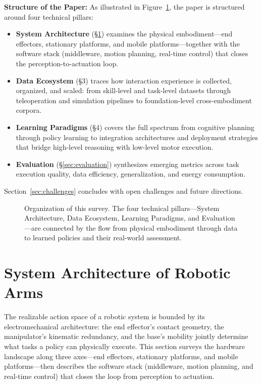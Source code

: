\documentclass[acmsmall,screen,review,anonymous]{acmart}
\begin{document}
\textbf{Structure of the Paper:}
As illustrated in Figure~\ref{fig:survey_structure}, the paper is structured around four technical pillars:

\begin{itemize}[nosep,leftmargin=*]
  \item \textbf{System Architecture} (\S\ref{sec:embodiment_hardware}) examines the physical embodiment---end effectors, stationary platforms, and mobile platforms---together with the software stack (middleware, motion planning, real-time control) that closes the perception-to-actuation loop.
  \item \textbf{Data Ecosystem} (\S3) traces how interaction experience is collected, organized, and scaled: from skill-level and task-level datasets through teleoperation and simulation pipelines to foundation-level cross-embodiment corpora.
  \item \textbf{Learning Paradigms} (\S4) covers the full spectrum from cognitive planning through policy learning to integration architectures and deployment strategies that bridge high-level reasoning with low-level motor execution.
  \item \textbf{Evaluation} (\S\ref{sec:evaluation}) synthesizes emerging metrics across task execution quality, data efficiency, generalization, and energy consumption.
\end{itemize}

Section~\ref{sec:challenges} concludes with open challenges and future directions.

\begin{figure}[t]
  \centering
  \framebox[\textwidth]{\rule{0pt}{6cm}} %
  \caption{Organization of this survey. The four technical pillars---System Architecture, Data Ecosystem, Learning Paradigms, and Evaluation---are connected by the flow from physical embodiment through data to learned policies and their real-world assessment.}\label{fig:survey_structure}
\end{figure}

\section{System Architecture of Robotic Arms}\label{sec:embodiment_hardware}

The realizable action space of a robotic system is bounded by its electromechanical architecture: the end effector's contact geometry, the manipulator's kinematic redundancy, and the base's mobility jointly determine what tasks a policy can physically execute. This section surveys the hardware landscape along three axes---end effectors, stationary platforms, and mobile platforms---then describes the software stack (middleware, motion planning, and real-time control) that closes the loop from perception to actuation.
\end{document}
